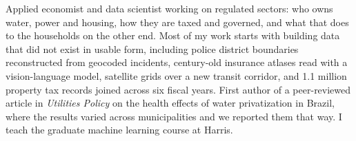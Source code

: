 {\small
Applied economist and data scientist working on regulated sectors: who owns water, power and housing, how they are taxed
and governed, and what that does to the households on the other end. Most of my work starts with
building data that did not exist in usable form, including police district boundaries reconstructed
from geocoded incidents, century-old insurance atlases read with a vision-language model, satellite
grids over a new transit corridor, and 1.1 million property tax records joined across six fiscal
years. First author of a peer-reviewed article in \textit{Utilities Policy} on the health effects of
water privatization in Brazil, where the results varied across municipalities and we reported them
that way. I teach the graduate machine learning course at Harris.
\par}
